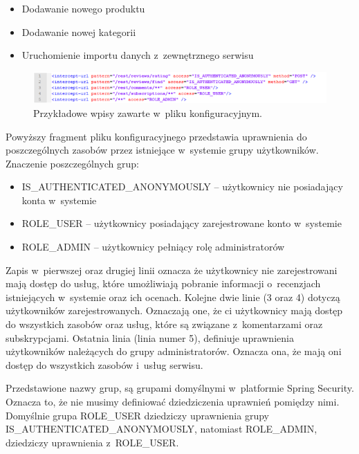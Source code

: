 \begin{itemize}
\item Dodawanie nowego produktu
\item Dodawanie nowej kategorii
\item Uruchomienie importu danych z~zewnętrznego serwisu
\end{itemize}

\begin{figure}[h]
	\centering
	\includegraphics[width=1.00\textwidth]{images/model_uprawnien_xml.png}
	\caption{Przykładowe wpisy zawarte w~pliku konfiguracyjnym.}
\end{figure}

Powyższy fragment pliku konfiguracyjnego przedstawia uprawnienia do poszczególnych zasobów przez istniejące w~systemie grupy użytkowników. Znaczenie poszczególnych grup:

\begin{itemize}
\item IS\_AUTHENTICATED\_ANONYMOUSLY – użytkownicy nie posiadający konta w~systemie
\item ROLE\_USER – użytkownicy posiadający zarejestrowane konto w~systemie
\item ROLE\_ADMIN – użytkownicy pełniący rolę administratorów
\end{itemize}

 Zapis w~pierwszej oraz drugiej linii oznacza że użytkownicy nie zarejestrowani mają dostęp do usług, które umożliwiają pobranie informacji o~recenzjach istniejących w~systemie oraz ich ocenach.
Kolejne dwie linie (3 oraz 4) dotyczą użytkowników zarejestrowanych. Oznaczają one, że ci użytkownicy mają dostęp do wszystkich zasobów oraz usług, które są związane z~komentarzami oraz subskrypcjami.
Ostatnia linia (linia numer 5), definiuje uprawnienia użytkowników należących do grupy administratorów. Oznacza ona, że mają oni dostęp do wszystkich zasobów i~usług serwisu.

Przedstawione nazwy grup, są grupami domyślnymi w~platformie Spring Security. Oznacza to, że nie musimy definiować dziedziczenia uprawnień pomiędzy nimi. Domyślnie grupa ROLE\_USER dziedziczy uprawnienia grupy \newline IS\_AUTHENTICATED\_ANONYMOUSLY, natomiast ROLE\_ADMIN, dziedziczy uprawnienia z~ROLE\_USER.\cite{springSecurity}

